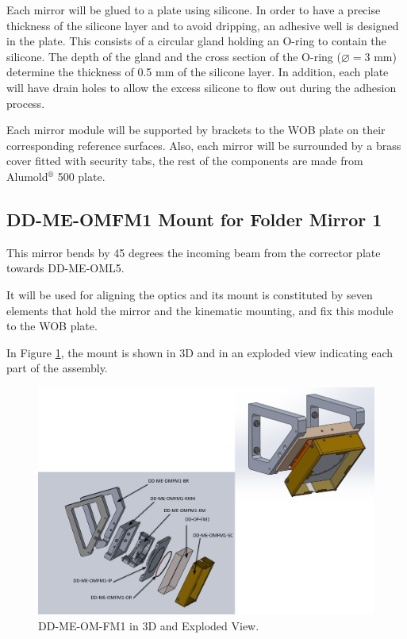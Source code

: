 \documentclass{report}
\begin{document}
Each mirror will be glued to a plate using silicone. In order to have a precise thickness of the silicone layer and to avoid dripping, an adhesive well is designed in the plate. This consists of a circular gland holding an O-ring to contain the silicone. The depth of the gland and the cross section of the O-ring ($\varnothing=3$ mm) determine the thickness of 0.5 mm of the silicone layer. In addition, each plate will have drain holes to allow the excess silicone to flow out during the adhesion process.

Each mirror module will be supported by brackets to the WOB plate on their corresponding reference surfaces. Also, each mirror will be surrounded by a brass cover fitted with security tabs, the rest of the components are made from Alumold${}^\circledR$ 500 plate. 


\subsection{DD-ME-OMFM1 Mount for Folder Mirror 1}

This mirror bends by 45 degrees the incoming beam from the corrector plate towards DD-ME-OML5.

It will be used for aligning the optics and its mount is constituted by seven elements that hold the mirror and the kinematic mounting, and fix this module to the WOB plate.

In Figure \ref{figure:FM1}, the mount is shown in 3D and in an exploded view indicating each part of the assembly.

\begin{figure}
\begin{center}
\includegraphics[width=0.7\linewidth]{figures/FM1-ExV.png}
\end{center}
\caption{DD-ME-OM-FM1 in 3D and Exploded View.}
\label{figure:FM1}
\end{figure}
\end{document}
